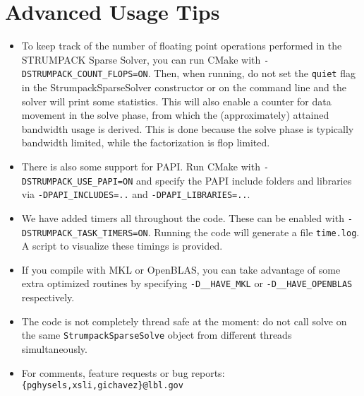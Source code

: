 \documentclass{article}
\newcommand{\tm}{\textsuperscript{\textregistered}}
\begin{document}
\section{Advanced Usage Tips}\label{sec:tips}
\begin{itemize}
\item To keep track of the number of floating point operations
  performed in the STRUMPACK Sparse Solver, you can run CMake with
  \lstinline[style=Bash]!-DSTRUMPACK_COUNT_FLOPS=ON!. Then, when
  running, do not set the \texttt{quiet} flag in the
  StrumpackSparseSolver constructor or on the command line and the
  solver will print some statistics. This will also enable a counter
  for data movement in the solve phase, from which the (approximately)
  attained bandwidth usage is derived. This is done because the solve
  phase is typically bandwidth limited, while the factorization is
  flop limited.
\item There is also some support for PAPI. Run CMake with
  \lstinline[style=Bash]!-DSTRUMPACK_USE_PAPI=ON! and specify the PAPI
  include folders and libraries via
  \lstinline[style=Bash]!-DPAPI_INCLUDES=..! and
  \lstinline[style=Bash]!-DPAPI_LIBRARIES=..!.
\item We have added timers all throughout the code. These can be
  enabled with
  \lstinline[style=Bash]!-DSTRUMPACK_TASK_TIMERS=ON!. Running the code
  will generate a file \lstinline[style=Bash]!time.log!. A script to
  visualize these timings is provided.
\item If you compile with MKL or OpenBLAS, you can take advantage of
  some extra optimized routines by specifying
  \lstinline[style=Bash]!-D__HAVE_MKL!  or
  \lstinline[style=Bash]!-D__HAVE_OPENBLAS! respectively.
\item The code is not completely thread safe at the moment: do not
  call solve on the same \lstinline[style=C]!StrumpackSparseSolve!
  object from different threads simultaneously.
\item For comments, feature requests or bug reports:
  \texttt{\{pghysels,xsli,gichavez\}@lbl.gov}
\end{itemize}
\end{document}
